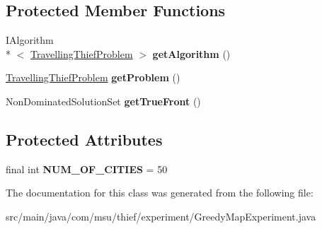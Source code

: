 \subsection*{Protected Member Functions}
\begin{DoxyCompactItemize}
\item 
\hypertarget{classcom_1_1msu_1_1thief_1_1experiment_1_1GreedyMapExperiment_aa19f8414d42c297c2c26bab228ecee41}{I\-Algorithm\\*
$<$ \hyperlink{classcom_1_1msu_1_1thief_1_1problems_1_1TravellingThiefProblem}{Travelling\-Thief\-Problem} $>$ {\bfseries get\-Algorithm} ()}\label{classcom_1_1msu_1_1thief_1_1experiment_1_1GreedyMapExperiment_aa19f8414d42c297c2c26bab228ecee41}

\item 
\hypertarget{classcom_1_1msu_1_1thief_1_1experiment_1_1GreedyMapExperiment_a1b4ddd16cc4e6af8013a79f998f611b2}{\hyperlink{classcom_1_1msu_1_1thief_1_1problems_1_1TravellingThiefProblem}{Travelling\-Thief\-Problem} {\bfseries get\-Problem} ()}\label{classcom_1_1msu_1_1thief_1_1experiment_1_1GreedyMapExperiment_a1b4ddd16cc4e6af8013a79f998f611b2}

\item 
\hypertarget{classcom_1_1msu_1_1thief_1_1experiment_1_1GreedyMapExperiment_a2dbe890d03bc7855c17fa53f2f8dabe8}{Non\-Dominated\-Solution\-Set {\bfseries get\-True\-Front} ()}\label{classcom_1_1msu_1_1thief_1_1experiment_1_1GreedyMapExperiment_a2dbe890d03bc7855c17fa53f2f8dabe8}

\end{DoxyCompactItemize}
\subsection*{Protected Attributes}
\begin{DoxyCompactItemize}
\item 
\hypertarget{classcom_1_1msu_1_1thief_1_1experiment_1_1GreedyMapExperiment_ab136006a9abf32be8188424852a0ade1}{final int {\bfseries N\-U\-M\-\_\-\-O\-F\-\_\-\-C\-I\-T\-I\-E\-S} = 50}\label{classcom_1_1msu_1_1thief_1_1experiment_1_1GreedyMapExperiment_ab136006a9abf32be8188424852a0ade1}

\end{DoxyCompactItemize}


The documentation for this class was generated from the following file\-:\begin{DoxyCompactItemize}
\item 
src/main/java/com/msu/thief/experiment/Greedy\-Map\-Experiment.\-java\end{DoxyCompactItemize}
